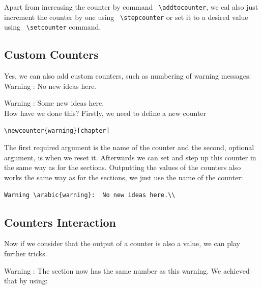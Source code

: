 \documentclass[a4paper,10pt]{report} %
\begin{document}
Apart from increasing the counter by command \texttt{ \textbackslash addtocounter}, we cal also just increment the counter by one using \texttt{ \textbackslash stepcounter} or set it to a desired value using \texttt{ \textbackslash setcounter} command. 
  
\subsection{Custom Counters}
Yes, we can also add custom counters, such as numbering of warning messages:\\

 Warning :  No new ideas here.\\
 \addtocounter{warning}{4}
 Warning :  Some new ideas here.\\
 
 How have we done this? Firstly, we need to define a new counter
\begin{lstlisting}[language={[latex]tex}, 
  frame=single,
  basicstyle=\footnotesize\color{darkgray}, 
  keywordstyle=\bf\color{magenta},
  commentstyle=\color{ForestGreen},  %
  breaklines=true
  ]
  \newcounter{warning}[chapter] 
\end{lstlisting}
The first required argument is the name of the counter and the second, optional argument, is when we reset it.
Afterwards we can set and step up this counter in the same way as for the sections. Outputting the values  of the counters also works the same way as for the sections, we just use the name of the counter:
\begin{lstlisting}[language={[latex]tex}, frame=single,basicstyle=\footnotesize,
  keywordstyle=\bf,
  commentstyle=\it\color{gray}
  ]
  Warning \arabic{warning}:  No new ideas here.\\
\end{lstlisting}

\setcounter{section}{\value{warning}}

\subsection{Counters Interaction}
Now if we consider that the output of a counter is also a value, we can play further tricks. 

Warning :  The section now has the same number as this warning. We achieved that by using:\\
\end{document}
